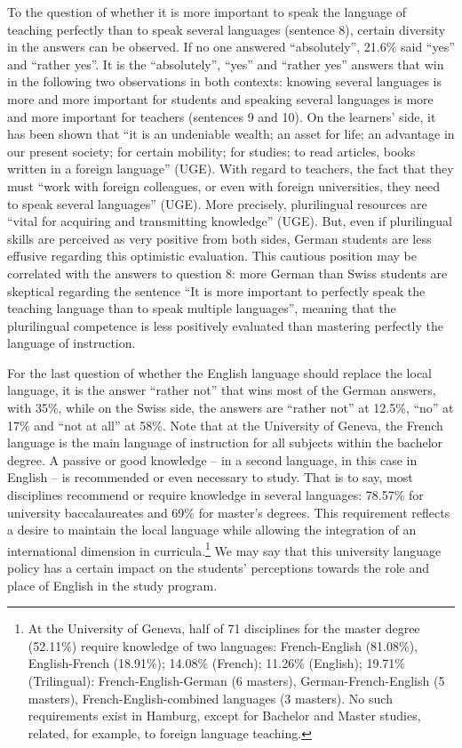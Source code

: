 \documentclass[output=paper]{../langscibook}
\begin{document}
To the question of whether it is more important to speak the language of teaching perfectly than to speak several languages (sentence 8), certain diversity in the answers can be observed. If no one answered “absolutely”, 21.6\% said “yes” and “rather yes”. It is the “absolutely”, “yes” and “rather yes” answers that win in the following two observations in both contexts: knowing several languages is more and more important for students and speaking several languages is more and more important for teachers (sentences 9 and 10). On the learners’ side, it has been shown that “it is an undeniable wealth; an asset for life; an advantage in our present society; for certain mobility; for studies; to read articles, books written in a foreign language” (UGE). With regard to teachers, the fact that they must “work with foreign colleagues, or even with foreign universities, they need to speak several languages” (UGE). More precisely, plurilingual resources are “vital for acquiring and transmitting knowledge” (UGE). But, even if plurilingual skills are perceived as very positive from both sides, German students are less effusive regarding this optimistic evaluation. This cautious position may be correlated with the answers to question 8: more German than Swiss students are skeptical regarding the sentence “It is more important to perfectly speak the teaching language than to speak multiple languages”, meaning that the plurilingual competence is less positively evaluated than mastering perfectly the language of instruction. 

For the last question of whether the English language should replace the local language, it is the answer “rather not” that wins most of the German answers, with 35\%, while on the Swiss side, the answers are “rather not” at 12.5\%, “no” at 17\% and “not at all” at 58\%. Note that at the University of Geneva, the French language is the main language of instruction for all subjects within the bachelor degree. A passive or good knowledge – in a second language, in this case in English – is recommended or even necessary to study. That is to say, most disciplines recommend or require knowledge in several languages: 78.57\% for university baccalaureates and 69\% for master’s degrees. This requirement reflects a desire to maintain the local language while allowing the integration of an international dimension in curricula.\footnote{At the University of Geneva, half of 71 disciplines for the master degree (52.11\%) require knowledge of two languages: French-English (81.08\%), English-French (18.91\%); 14.08\% (French); 11.26\% (English); 19.71\% (Trilingual): French-English-German (6 masters), German-French-English (5 masters), French-English-combined languages (3 masters). No such requirements exist in Hamburg, except for Bachelor and Master studies, related, for example, to foreign language teaching.} We may say that this university language policy has a certain impact on the students’ perceptions towards the role and place of English in the study program.
\end{document}
